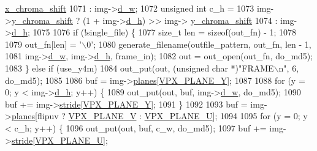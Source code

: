 \begin{DoxyCodeInclude}
{{{{{{{{{{{{{{{{{{{{{{{{{{{{{{{{{{{{{{{{      \hyperlink{structvpx__image_affaf210489dcefebd90b87fd5f12dc0b}{x\_chroma\_shift}
1071                                 : img->\hyperlink{structvpx__image_a806bf23143bf00a0b3fdbd6ba030c483}{d\_w};
1072         \textcolor{keywordtype}{unsigned} \textcolor{keywordtype}{int} c\_h =
1073             img->\hyperlink{structvpx__image_a1e3d9b699d46ca32e3916d1ac635a4a2}{y\_chroma\_shift} ? (1 + img->\hyperlink{structvpx__image_a31bc5f045d4f3c2b6bb0f57bb53078e7}{d\_h}) >> img->
      \hyperlink{structvpx__image_a1e3d9b699d46ca32e3916d1ac635a4a2}{y\_chroma\_shift}
1074                                 : img->\hyperlink{structvpx__image_a31bc5f045d4f3c2b6bb0f57bb53078e7}{d\_h};
1075 
1076         \textcolor{keywordflow}{if} (!single\_file) \{
1077           \textcolor{keywordtype}{size\_t} len = \textcolor{keyword}{sizeof}(out\_fn) - 1;
1078 
1079           out\_fn[len] = \textcolor{charliteral}{'\(\backslash\)0'};
1080           generate\_filename(outfile\_pattern, out\_fn, len - 1,
1081                             img->\hyperlink{structvpx__image_a806bf23143bf00a0b3fdbd6ba030c483}{d\_w}, img->\hyperlink{structvpx__image_a31bc5f045d4f3c2b6bb0f57bb53078e7}{d\_h}, frame\_in);
1082           out = out\_open(out\_fn, do\_md5);
1083         \} \textcolor{keywordflow}{else} \textcolor{keywordflow}{if} (use\_y4m)
1084           out\_put(out, (\textcolor{keywordtype}{unsigned} \textcolor{keywordtype}{char} *)\textcolor{stringliteral}{"FRAME\(\backslash\)n"}, 6, do\_md5);
1085 
1086         buf = img->\hyperlink{structvpx__image_ab6258308ba7a5f4a113348120e20e2ce}{planes}[\hyperlink{vpx__image_8h_a08171c4636c655e1ab0b76e06219f9e2}{VPX\_PLANE\_Y}];
1087 
1088         \textcolor{keywordflow}{for} (y = 0; y < img->\hyperlink{structvpx__image_a31bc5f045d4f3c2b6bb0f57bb53078e7}{d\_h}; y++) \{
1089           out\_put(out, buf, img->\hyperlink{structvpx__image_a806bf23143bf00a0b3fdbd6ba030c483}{d\_w}, do\_md5);
1090           buf += img->\hyperlink{structvpx__image_ac9c7b83e3eea44cb680956f90dc789cf}{stride}[\hyperlink{vpx__image_8h_a08171c4636c655e1ab0b76e06219f9e2}{VPX\_PLANE\_Y}];
1091         \}
1092 
1093         buf = img->\hyperlink{structvpx__image_ab6258308ba7a5f4a113348120e20e2ce}{planes}[flipuv ? \hyperlink{vpx__image_8h_aca9436ec761457cc6d2e356e0ac2fd23}{VPX\_PLANE\_V} : \hyperlink{vpx__image_8h_a4770fc8fa60021a2229f25553152cf81}{VPX\_PLANE\_U}];
1094 
1095         \textcolor{keywordflow}{for} (y = 0; y < c\_h; y++) \{
1096           out\_put(out, buf, c\_w, do\_md5);
1097           buf += img->\hyperlink{structvpx__image_ac9c7b83e3eea44cb680956f90dc789cf}{stride}[\hyperlink{vpx__image_8h_a4770fc8fa60021a2229f25553152cf81}{VPX\_PLANE\_U}];
}}}}}}}}}}}}}}}}}}}}}}}}}}}}}}}}}}}}}}}}
\end{DoxyCodeInclude}
